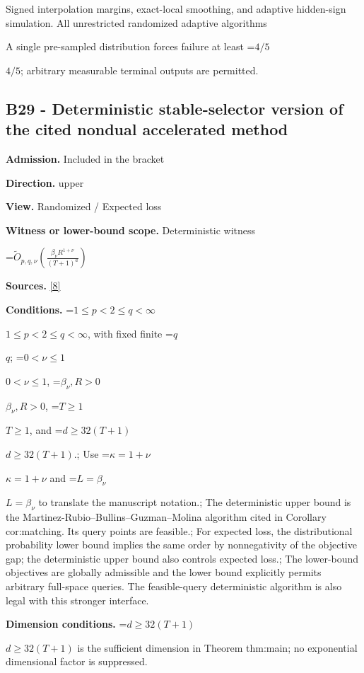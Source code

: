 \documentclass[10pt,a4paper]{article}
\newcommand{\AtlasMath}[1]{\par\begingroup\centering\setbox0=\hbox{$\displaystyle #1$}\ifdim\wd0>1.4\linewidth\typeout{ATLAS WIDE FORMULA: \the\wd0}\fi\ifdim\wd0>\linewidth\resizebox{\linewidth}{!}{\box0}\else\box0\fi\par\endgroup}
\newcommand{\AtlasInlineMath}[1]{\begingroup\setbox0=\hbox{$#1$}\ifdim\wd0>.4\linewidth\endgroup\AtlasMath{#1}\else\endgroup$#1$\fi}
\begin{document}
Signed interpolation margins, exact-local smoothing, and adaptive hidden-sign simulation. All unrestricted randomized adaptive algorithms



A single pre-sampled distribution forces failure at least \AtlasInlineMath{4/5}; arbitrary measurable terminal outputs are permitted.



\subsection{B29 - Deterministic stable-selector version of the cited nondual accelerated method}


\textbf{Admission.} Included in the bracket



\textbf{Direction.} upper



\textbf{View.} Randomized / Expected loss



\textbf{Witness or lower-bound scope.} Deterministic witness



\AtlasMath{\widetilde O_{p,q,\nu}\!\left(\frac{\beta_\nu R^{1+\nu}}{(T+1)^a}\right)}


\textbf{Sources.} \href{https://github.com/WU-Wendao/Colombo/blob/main/colombo_sensorium/Complexity_altas/data/sources/colombo/B1/manuscript.pdf}{[8]}



\textbf{Conditions.} \AtlasInlineMath{1\le p<2\le q<\infty}, with fixed finite \AtlasInlineMath{q}; \AtlasInlineMath{0<\nu\le1}, \AtlasInlineMath{\beta_\nu,R>0}, \AtlasInlineMath{T\ge1}, and \AtlasInlineMath{d\ge32(T+1)}.; Use \AtlasInlineMath{\kappa=1+\nu} and \AtlasInlineMath{L=\beta_\nu} to translate the manuscript notation.; The deterministic upper bound is the Martinez-Rubio--Bullins--Guzman--Molina algorithm cited in Corollary cor:matching. Its query points are feasible.; For expected loss, the distributional probability lower bound implies the same order by nonnegativity of the objective gap; the deterministic upper bound also controls expected loss.; The lower-bound objectives are globally admissible and the lower bound explicitly permits arbitrary full-space queries. The feasible-query deterministic algorithm is also legal with this stronger interface.



\textbf{Dimension conditions.} \AtlasInlineMath{d\ge32(T+1)} is the sufficient dimension in Theorem thm:main; no exponential dimensional factor is suppressed.
\end{document}
